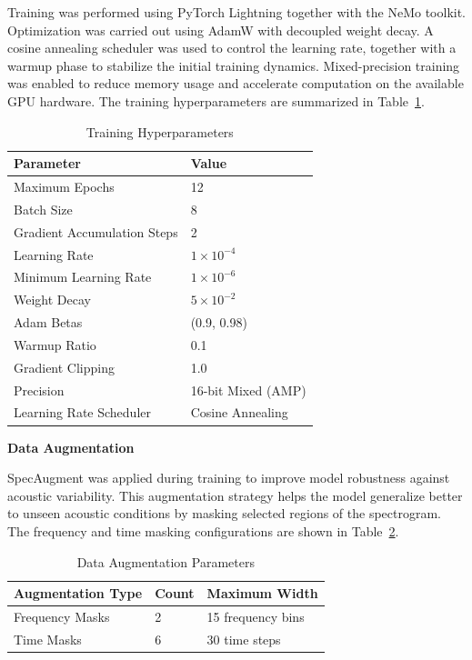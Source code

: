 Training was performed using PyTorch Lightning together with the NeMo toolkit. Optimization was carried out using AdamW with decoupled weight decay. A cosine annealing scheduler was used to control the learning rate, together with a warmup phase to stabilize the initial training dynamics. Mixed-precision training was enabled to reduce memory usage and accelerate computation on the available GPU hardware. The training hyperparameters are summarized in Table~\ref{tab:fastconformer_train}.

\begin{table}[H]
\caption{Training Hyperparameters}
\label{tab:fastconformer_train}
\centering
\begin{tabular}{|l|l|}
\hline
\textbf{Parameter} & \textbf{Value} \\
\hline
Maximum Epochs & 12 \\
Batch Size & 8 \\
Gradient Accumulation Steps & 2 \\
Learning Rate & $1\times10^{-4}$ \\
Minimum Learning Rate & $1\times10^{-6}$ \\
Weight Decay & $5\times10^{-2}$ \\
Adam Betas & (0.9, 0.98) \\
Warmup Ratio & 0.1 \\
Gradient Clipping & 1.0 \\
Precision & 16-bit Mixed (AMP) \\
Learning Rate Scheduler & Cosine Annealing \\
\hline
\end{tabular}
\end{table}

\textbf{Data Augmentation}

SpecAugment was applied during training to improve model robustness against acoustic variability. This augmentation strategy helps the model generalize better to unseen acoustic conditions by masking selected regions of the spectrogram. The frequency and time masking configurations are shown in Table~\ref{tab:fastconformer_aug}.

\begin{table}[H]
\caption{Data Augmentation Parameters}
\label{tab:fastconformer_aug}
\centering
\begin{tabular}{|l|l|l|}
\hline
\textbf{Augmentation Type} & \textbf{Count} & \textbf{Maximum Width} \\
\hline
Frequency Masks & 2 & 15 frequency bins \\
Time Masks & 6 & 30 time steps \\
\hline
\end{tabular}
\end{table}


